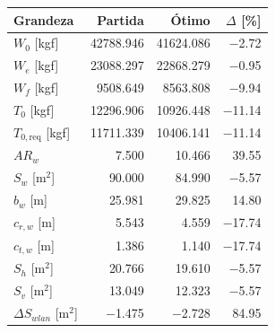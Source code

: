 \begin{tabular}{lrrr}
\toprule
Grandeza & Partida & Ótimo & $\Delta$ [\%] \\
\midrule
$W_0$ [kgf] & 42788.946 & 41624.086 & $-$2.72 \\
$W_e$ [kgf] & 23088.297 & 22868.279 & $-$0.95 \\
$W_f$ [kgf] & 9508.649 & 8563.808 & $-$9.94 \\
$T_0$ [kgf] & 12296.906 & 10926.448 & $-$11.14 \\
$T_{0,\mathrm{req}}$ [kgf] & 11711.339 & 10406.141 & $-$11.14 \\
$AR_w$ & 7.500 & 10.466 & 39.55 \\
$S_w$ [m$^2$] & 90.000 & 84.990 & $-$5.57 \\
$b_w$ [m] & 25.981 & 29.825 & 14.80 \\
$c_{r,w}$ [m] & 5.543 & 4.559 & $-$17.74 \\
$c_{t,w}$ [m] & 1.386 & 1.140 & $-$17.74 \\
$S_h$ [m$^2$] & 20.766 & 19.610 & $-$5.57 \\
$S_v$ [m$^2$] & 13.049 & 12.323 & $-$5.57 \\
$\Delta S_{wlan}$ [m$^2$] & $-$1.475 & $-$2.728 & 84.95 \\
\bottomrule
\end{tabular}